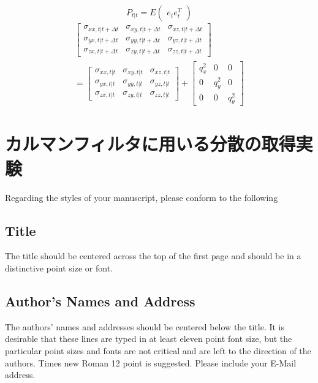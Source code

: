 \documentclass[a4paper]{article}
\begin{document}
\begin{equation}
    P_{t|t} = E
    \begin{pmatrix}
        e_{t} e_{t}^{T}
    \end{pmatrix}
    \label{eq:5}
\end{equation}
%
%
\begin{equation}
    \begin{split}
    \begin{bmatrix}
    \sigma_{xx,t|t+\Delta t} &\sigma_{xy,t|t+\Delta t} &\sigma_{xz,t|t+\Delta t} \\
    \sigma_{yx,t|t+\Delta t} &\sigma_{yy,t|t+\Delta t} &\sigma_{yz,t|t+\Delta t} \\
    \sigma_{zx,t|t+\Delta t} &\sigma_{zy,t|t+\Delta t} &\sigma_{zz,t|t+\Delta t} 
    \end{bmatrix} \\
    = 
    \begin{bmatrix}
        \sigma_{xx,t|t} &\sigma_{xy,t|t} &\sigma_{xz,t|t} \\
        \sigma_{yx,t|t} &\sigma_{yy,t|t} &\sigma_{yz,t|t} \\
        \sigma_{zx,t|t} &\sigma_{zy,t|t} &\sigma_{zz,t|t}
    \end{bmatrix} 
    +
    \begin{bmatrix}
        q_{x}^{2} &0         &0 \\
        0         &q_{y}^{2} &0 \\
        0         &0         &q_{\theta}^{2}
    \end{bmatrix}
\end{split}
    \label{eq:6} 
\end{equation}


\section{カルマンフィルタに用いる分散の取得実験}

Regarding the styles of your manuscript, please conform to the following 

\subsection{Title}
The title should be centered across the top of the first page and should 
be in a distinctive point size or font.

\subsection{Author's Names and Address}
The authors' names and addresses should be centered below the title.
It is desirable that these lines are typed in at least eleven point font size,
but the particular point sizes and fonts are not critical and are left to the
direction of the authors.
Times new Roman 12 point is suggested.
Please include your E-Mail address. 
\end{document}
